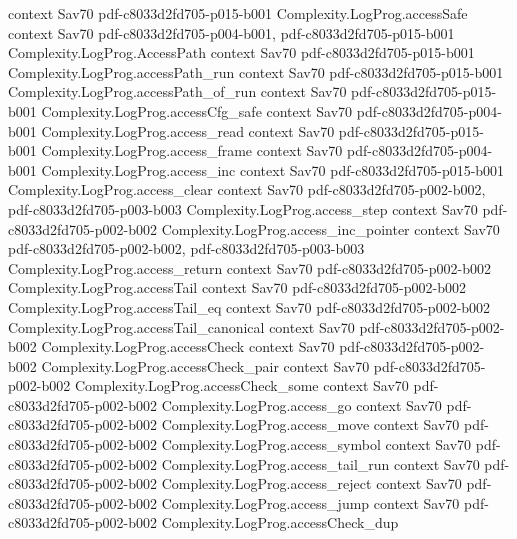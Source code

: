 \begin{theorem}
  {context}
  {Sav70}
  {pdf-c8033d2fd705-p015-b001}
\proofstep
  {Complexity.LogProg.accessSafe}
  {context}
  {Sav70}
  {pdf-c8033d2fd705-p004-b001,
    pdf-c8033d2fd705-p015-b001}
\proofstep
  {Complexity.LogProg.AccessPath}
  {context}
  {Sav70}
  {pdf-c8033d2fd705-p015-b001}
\proofstep
  {Complexity.LogProg.accessPath_run}
  {context}
  {Sav70}
  {pdf-c8033d2fd705-p015-b001}
\proofstep
  {Complexity.LogProg.accessPath_of_run}
  {context}
  {Sav70}
  {pdf-c8033d2fd705-p015-b001}
\proofstep
  {Complexity.LogProg.accessCfg_safe}
  {context}
  {Sav70}
  {pdf-c8033d2fd705-p004-b001}
\proofstep
  {Complexity.LogProg.access_read}
  {context}
  {Sav70}
  {pdf-c8033d2fd705-p015-b001}
\proofstep
  {Complexity.LogProg.access_frame}
  {context}
  {Sav70}
  {pdf-c8033d2fd705-p004-b001}
\proofstep
  {Complexity.LogProg.access_inc}
  {context}
  {Sav70}
  {pdf-c8033d2fd705-p015-b001}
\proofstep
  {Complexity.LogProg.access_clear}
  {context}
  {Sav70}
  {pdf-c8033d2fd705-p002-b002,
    pdf-c8033d2fd705-p003-b003}
\proofstep
  {Complexity.LogProg.access_step}
  {context}
  {Sav70}
  {pdf-c8033d2fd705-p002-b002}
\proofstep
  {Complexity.LogProg.access_inc_pointer}
  {context}
  {Sav70}
  {pdf-c8033d2fd705-p002-b002,
    pdf-c8033d2fd705-p003-b003}
\proofstep
  {Complexity.LogProg.access_return}
  {context}
  {Sav70}
  {pdf-c8033d2fd705-p002-b002}
\proofstep
  {Complexity.LogProg.accessTail}
  {context}
  {Sav70}
  {pdf-c8033d2fd705-p002-b002}
\proofstep
  {Complexity.LogProg.accessTail_eq}
  {context}
  {Sav70}
  {pdf-c8033d2fd705-p002-b002}
\proofstep
  {Complexity.LogProg.accessTail_canonical}
  {context}
  {Sav70}
  {pdf-c8033d2fd705-p002-b002}
\proofstep
  {Complexity.LogProg.accessCheck}
  {context}
  {Sav70}
  {pdf-c8033d2fd705-p002-b002}
\proofstep
  {Complexity.LogProg.accessCheck_pair}
  {context}
  {Sav70}
  {pdf-c8033d2fd705-p002-b002}
\proofstep
  {Complexity.LogProg.accessCheck_some}
  {context}
  {Sav70}
  {pdf-c8033d2fd705-p002-b002}
\proofstep
  {Complexity.LogProg.access_go}
  {context}
  {Sav70}
  {pdf-c8033d2fd705-p002-b002}
\proofstep
  {Complexity.LogProg.access_move}
  {context}
  {Sav70}
  {pdf-c8033d2fd705-p002-b002}
\proofstep
  {Complexity.LogProg.access_symbol}
  {context}
  {Sav70}
  {pdf-c8033d2fd705-p002-b002}
\proofstep
  {Complexity.LogProg.access_tail_run}
  {context}
  {Sav70}
  {pdf-c8033d2fd705-p002-b002}
\proofstep
  {Complexity.LogProg.access_reject}
  {context}
  {Sav70}
  {pdf-c8033d2fd705-p002-b002}
\proofstep
  {Complexity.LogProg.access_jump}
  {context}
  {Sav70}
  {pdf-c8033d2fd705-p002-b002}
\proofstep
  {Complexity.LogProg.accessCheck_dup}

\end{theorem}
